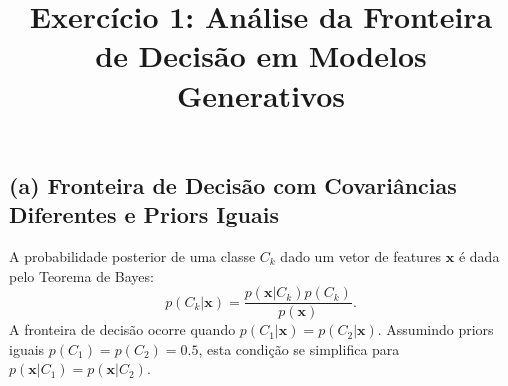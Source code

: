 \documentclass{article}
\title{Exercício 1: Análise da Fronteira de Decisão em Modelos Generativos}
\author{}
\date{}
\begin{document}
\maketitle

\section*{}

\subsection*{(a) Fronteira de Decisão com Covariâncias Diferentes e Priors Iguais}

A probabilidade posterior de uma classe $C_k$ dado um vetor de features $\mathbf{x}$ é dada pelo Teorema de Bayes:
\[
p(C_k | \mathbf{x}) = \frac{p(\mathbf{x} | C_k) p(C_k)}{p(\mathbf{x})}.
\]
A fronteira de decisão ocorre quando $p(C_1 | \mathbf{x}) = p(C_2 | \mathbf{x})$. Assumindo priors iguais $p(C_1) = p(C_2) = 0.5$, esta condição se simplifica para $p(\mathbf{x} | C_1) = p(\mathbf{x} | C_2)$.
\end{document}
